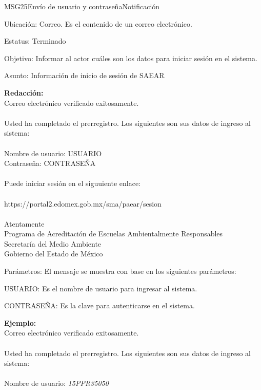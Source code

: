 \begin{mensaje}{MSG25}{Envío de usuario y contraseña}{Notificación}
    \item[Ubicación:] Correo. Es el contenido de un correo electrónico.
    \item[Estatus:] Terminado
    \item[Objetivo:] Informar al actor cuáles son los datos para iniciar sesión en el sistema.
    \item[Asunto:] Información de inicio de sesión de SAEAR
    \item[]{\bf Redacción:}\\
	  Correo electrónico verificado exitosamente.\\ \\
	  Usted ha completado el prerregistro. Los siguientes son sus datos de ingreso al sistema:\\ \\
	  Nombre de usuario: USUARIO   \\
	  Contraseña: CONTRASEÑA \\ \\
	  Puede iniciar sesión en el siguuiente enlace:\\ \\
	  https://portal2.edomex.gob.mx/sma/paear/sesion \\ \\
	  Atentamente\\
	  Programa de Acreditación de Escuelas Ambientalmente Responsables\\
	  Secretaría del Medio Ambiente\\
	  Gobierno del Estado de México\\
    \item[Parámetros:] El mensaje se muestra con base en los siguientes parámetros:
    \begin{Citemize}
	    \item USUARIO: Es el nombre de usuario para ingresar al sistema.
	    \item CONTRASEÑA: Es la clave para autenticarse en el sistema.
    \end{Citemize}
    \item[]{\bf Ejemplo:}\\
	  Correo electrónico verificado exitosamente.\\ \\
	  Usted ha completado el prerregistro. Los siguientes son sus datos de ingreso al sistema:\\ \\
	  Nombre de usuario: {\em 15PPR35050}\\

\end{mensaje}
